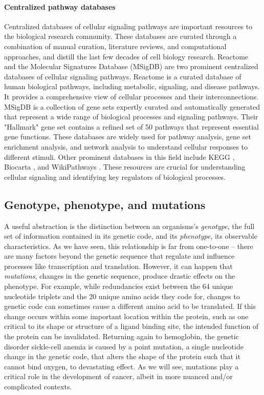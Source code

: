 \paragraph{Centralized pathway databases}
Centralized databases of cellular signaling pathways are important resources to the biological research community.
These databases are curated through a combination of manual curation, literature reviews, and computational approaches, and distill the last few decades of cell biology research.
Reactome \cite{vastrik2007} and the Molecular Signatures Database (MSigDB) \cite{liberali2014} are two prominent centralized databases of cellular signaling pathways.
Reactome is a curated database of human biological pathways, including metabolic, signaling, and disease pathways.
It provides a comprehensive view of cellular processes and their interconnections.
MSigDB is a collection of gene sets expertly curated and automatically generated that represent a wide range of biological processes and signaling pathways.
Their "Hallmark" gene set contains a refined set of 50 pathways that represent essential gene functions.
These databases are widely used for pathway analysis, gene set enrichment analysis, and network analysis to understand cellular responses to different stimuli.
Other prominent databases in this field include KEGG \cite{kanehisa2000}, Biocarta \cite{nishimura2001}, and WikiPathways \cite{agrawal2024}.
These resources are crucial for understanding cellular signaling and identifying key regulators of biological processes.

\subsection{Genotype, phenotype, and mutations}
A useful abstraction is the distinction between an organisms's \emph{genotype}, the full set of information contained in its genetic code, and its \emph{phenotype}, its observable characteristics.
As we have seen, this relationship is far from one-to-one -- there are many factors beyond the genetic sequence that regulate and influence processes like transcription and translation.
However, it can happen that \emph{mutations}, changes in the genetic sequence, produce drastic effects on the phenotype.
For example, while redundancies exist between the 64 unique nucleotide triplets and the 20 unique amino acids they code for, changes to genetic code can sometimes cause a different amino acid to be translated.
If this change occurs within some important location within the protein, such as one critical to its shape or structure of a ligand binding site, the intended function of the protein can be invalidated.
Returning again to hemoglobin, the genetic disorder sickle-cell anemia is caused by a point mutation, a single nucleotide change in the genetic code, that alters the shape of the protein such that it cannot bind oxygen, to devastating effect.
As we will see, mutations play a critical role in the development of cancer, albeit in more nuanced and/or complicated contexts.

